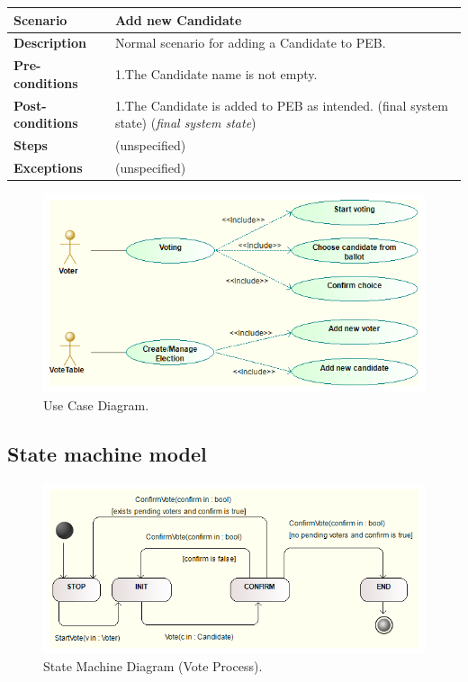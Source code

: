 \documentclass{article}
\begin{document}
\begin{center}
    \begin{tabular}{ | l | p{9cm} |}
    \hline
   \textbf{Scenario}	& \textbf{Add new Candidate }  \\ \hline
    \textbf{Description}	&Normal scenario for adding a Candidate to PEB.\\ \hline
   \textbf{Pre-conditions}	&1.The Candidate name is not empty.
\\ \hline
 \textbf{Post-conditions} & 1.The Candidate is added to PEB as intended. (final system state)  (\textit{final system state}) \\ \hline
   \textbf{Steps} &  (unspecified)
 \\ 
    \hline
\textbf{Exceptions}& 	(unspecified)
 \\ 
    \hline
    \end{tabular}
\end{center}

\begin{figure}[!h]
\centering
	\includegraphics[width=\textwidth,height=\textheight,keepaspectratio]{use.png}
	\caption{Use Case Diagram.}
	\label{fig:PropProf}
\end{figure}
\subsection{State machine model}
\begin{figure}[h!]
\centering
	\includegraphics[width=\textwidth,height=\textheight,keepaspectratio]{state.png}
	\caption{State Machine Diagram (Vote Process).}
	\label{fig:PropProf}
\end{figure}
\end{document}
